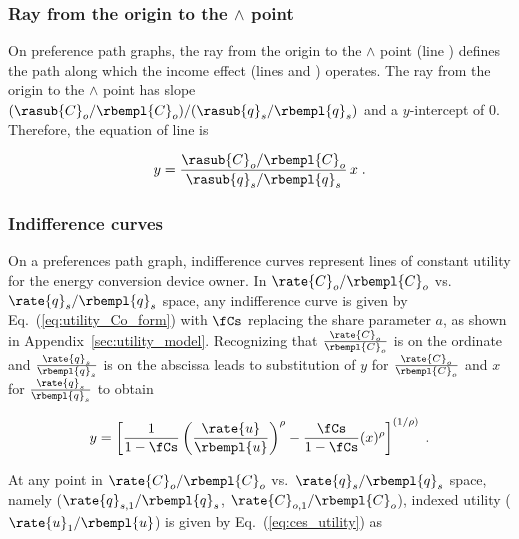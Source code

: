 \subsubsection{Ray from the origin to the $\wedge$ point} 
\label{sec:pref_graph_ray}

On preference path graphs, 
the ray from the origin to the $\wedge$ point 
(line \rr{})
defines the path along which the income effect
(lines \hatd{} and \dbar{})
operates.
The ray from the origin to the $\wedge$ point
has slope $(\rasub{C}_o/\rbempl{C}_o) / (\rasub{q}_s/\rbempl{q}_s)$
and a $y$-intercept of 0.
Therefore, the equation of line \rr{} is

\begin{equation} \label{eq:ray_prefs}
  y = \frac{\rasub{C}_o/\rbempl{C}_o}{\rasub{q}_s/\rbempl{q}_s} \, x \; .
\end{equation}


\subsubsection{Indifference curves} 
\label{sec:pref_graph_indifference_curves}

On a preferences path graph, 
indifference curves represent lines of constant utility
for the energy conversion device owner.
In $\rate{C}_o/\rbempl{C}_o$ vs.\ $\rate{q}_s/\rbempl{q}_s$ space, 
any indifference curve 
is given by 
Eq.~(\ref{eq:utility_Co_form})
with $\fCs$ replacing the share parameter $a$, 
as shown in Appendix~\ref{sec:utility_model}.
Recognizing that 
$\frac{\rate{C}_o}{\rbempl{C}_o}$ is on the ordinate and 
$\frac{\rate{q}_s}{\rbempl{q}_s}$ is on the abscissa
leads to substitution of 
$y$ for $\frac{\rate{C}_o}{\rbempl{C}_o}$ and 
$x$ for $\frac{\rate{q}_s}{\rbempl{q}_s}$ to obtain

\begin{equation} \label{eq:utility_line_form}
  y = \left[ \frac{1}{1 - \fCs} \left( \frac{\rate{u}}{\rbempl{u}} \right)^\rho 
            - \frac{\fCs}{1 - \fCs} (x)^\rho \right]^{(1/\rho)} \; .
\end{equation}

At any point in 
$\rate{C}_o/\rbempl{C}_o$ vs.\ $\rate{q}_s/\rbempl{q}_s$ space,
namely ($\rate{q}_{s,1}/\rbempl{q}_s$, $\rate{C}_{o,1}/\rbempl{C}_o$),
indexed utility ($\rate{u}_1/\rbempl{u}$) is given by Eq.~(\ref{eq:ces_utility}) as

